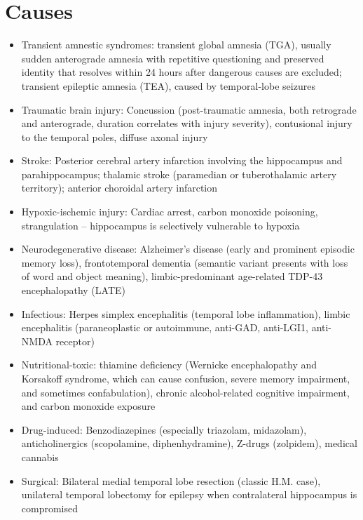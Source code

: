 \section*{Causes}
\begin{itemize}
 \item Transient amnestic syndromes: transient global amnesia (TGA), usually sudden anterograde amnesia with repetitive questioning and preserved identity that resolves within 24 hours after dangerous causes are excluded; transient epileptic amnesia (TEA), caused by temporal-lobe seizures
 \item Traumatic brain injury: Concussion (post-traumatic amnesia, both retrograde and anterograde, duration correlates with injury severity), contusional injury to the temporal poles, diffuse axonal injury
 \item Stroke: Posterior cerebral artery infarction involving the hippocampus and parahippocampus; thalamic stroke (paramedian or tuberothalamic artery territory); anterior choroidal artery infarction
 \item Hypoxic-ischemic injury: Cardiac arrest, carbon monoxide poisoning, strangulation -- hippocampus is selectively vulnerable to hypoxia
 \item Neurodegenerative disease: Alzheimer's disease (early and prominent episodic memory loss), frontotemporal dementia (semantic variant presents with loss of word and object meaning), limbic-predominant age-related TDP-43 encephalopathy (LATE)
 \item Infectious: Herpes simplex encephalitis (temporal lobe inflammation), limbic encephalitis (paraneoplastic or autoimmune, anti-GAD, anti-LGI1, anti-NMDA receptor)
 \item Nutritional-toxic: thiamine deficiency (Wernicke encephalopathy and Korsakoff syndrome, which can cause confusion, severe memory impairment, and sometimes confabulation), chronic alcohol-related cognitive impairment, and carbon monoxide exposure
 \item Drug-induced: Benzodiazepines (especially triazolam, midazolam), anticholinergics (scopolamine, diphenhydramine), Z-drugs (zolpidem), medical cannabis
 \item Surgical: Bilateral medial temporal lobe resection (classic H.M. case), unilateral temporal lobectomy for epilepsy when contralateral hippocampus is compromised
\end{itemize}

